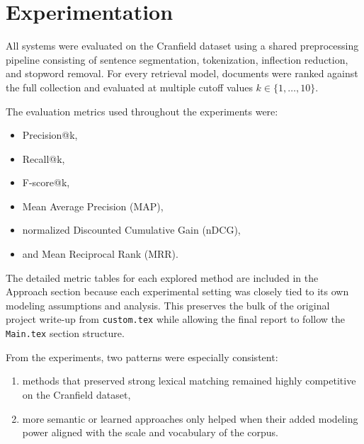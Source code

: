 \section{Experimentation}\label{sec:exp}

All systems were evaluated on the Cranfield dataset using a shared preprocessing pipeline consisting of sentence segmentation, tokenization, inflection reduction, and stopword removal. For every retrieval model, documents were ranked against the full collection and evaluated at multiple cutoff values $k \in \{1,\dots,10\}$.

The evaluation metrics used throughout the experiments were:
\begin{itemize}
    \item Precision@k,
    \item Recall@k,
    \item F-score@k,
    \item Mean Average Precision (MAP),
    \item normalized Discounted Cumulative Gain (nDCG),
    \item and Mean Reciprocal Rank (MRR).
\end{itemize}

The detailed metric tables for each explored method are included in the Approach section because each experimental setting was closely tied to its own modeling assumptions and analysis. This preserves the bulk of the original project write-up from \texttt{custom.tex} while allowing the final report to follow the \texttt{Main.tex} section structure.

From the experiments, two patterns were especially consistent:
\begin{enumerate}
    \item methods that preserved strong lexical matching remained highly competitive on the Cranfield dataset,
    \item more semantic or learned approaches only helped when their added modeling power aligned with the scale and vocabulary of the corpus.
\end{enumerate}
